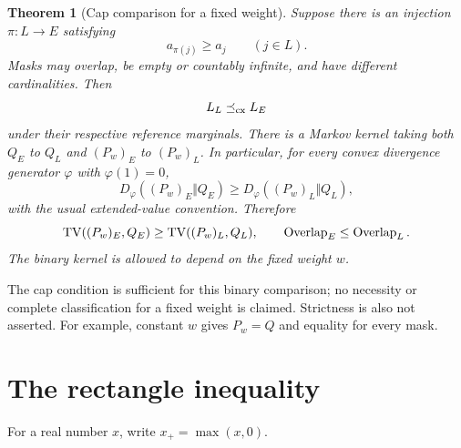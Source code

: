 \documentclass[11pt,a4paper]{article}
\newtheorem{theorem}{Theorem}[section]\newtheorem{lemma}[theorem]{Lemma}
\theoremstyle{remark}\newtheorem*{ednote}{Editorial note (ProveIt, 2026-10-01)}
\begin{document}
\begin{theorem}[Cap comparison for a fixed weight]\label{thm:main}
Suppose there is an injection $\pi:L\to E$ satisfying
\begin{equation}\label{eq:matching}
 a_{\pi(j)}\ge a_j\qquad(j\in L).
\end{equation}
Masks may overlap, be empty or countably infinite, and have different cardinalities. Then
\begin{equation}\label{eq:cx}
 L_L\preceq_{\rm cx}L_E
\end{equation}
under their respective reference marginals. There is a Markov kernel taking both $Q_E$ to $Q_L$ and $(P_w)_E$ to $(P_w)_L$. In particular, for every convex divergence generator $\varphi$ with $\varphi(1)=0$,
\begin{equation}\label{eq:divergence}
 D_\varphi((P_w)_E\Vert Q_E)
 \ge D_\varphi((P_w)_L\Vert Q_L),
\end{equation}
with the usual extended-value convention. Therefore
\begin{equation}\label{eq:tv}
 \operatorname{TV}((P_w)_E,Q_E)\ge\operatorname{TV}((P_w)_L,Q_L),
 \qquad \operatorname{Overlap}_E\le\operatorname{Overlap}_L.
\end{equation}
The binary kernel is allowed to depend on the fixed weight $w$.
\end{theorem}

The cap condition is sufficient for this binary comparison; no necessity or complete classification for a fixed weight is claimed. Strictness is also not asserted. For example, constant $w$ gives $P_w=Q$ and equality for every mask.

\section{The rectangle inequality}
For a real number $x$, write $x_+=\max(x,0)$.
\end{document}
